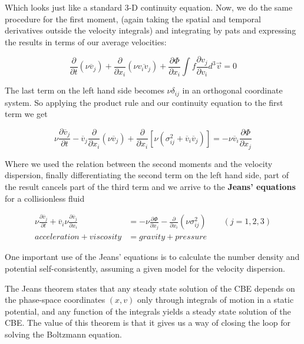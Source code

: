 Which looks just like a standard 3-D continuity equation. Now, we do the same procedure for the first moment, (again taking the spatial and temporal derivatives outside the velocity integrals) and integrating by pats and expressing the results in terms of our average velocities:

\begin{equation}
\frac{\partial}{\partial t}(\nu \overline{v}_{j})+\frac{\partial}{\partial x_{i}}(\nu \overline{v_{i}v_{j}})+\frac{\partial \Phi}{\partial x_{i}}\int f\frac{\partial v_{j}}{\partial v_{i}}d^{3}\vec{v}=0
\end{equation} 

The last term on the left hand side becomes $\nu \delta_{ij}$ in an orthogonal coordinate system. So applying the product rule and our continuity equation to the first term we get

\begin{equation}
\nu \frac{\partial \overline{v}_{j}}{\partial t}-\overline{v}_{j}\frac{\partial}{\partial x_{i}}(\nu \overline{v}_{j})+\frac{\partial}{\partial x_{i}}[\nu(\sigma_{ij}^{2}+\overline{v}_{i}\overline{v}_{j})]=-\nu \overline{v}_{i}\frac{\partial \Phi}{\partial x_{j}}
\end{equation}

Where we used the relation between the second moments and the velocity dispersion, finally differentiating the second term on the left hand side, part of the result cancels part of the third term and we arrive to the \textbf{Jeans' equations} for a collisionless fluid

\begin{equation}
\begin{aligned}	
	\nu \frac{\partial \overline{v}_j}{\partial t} + \overline{v}_i\nu \frac{\partial\overline{v}_j}{\partial x_{i}} &= -\nu \frac{\partial\Phi}{\partial x_{j}}-\frac{\partial}{\partial x_{i}}(\nu \sigma_{ij}^{2})\quad\quad (j=1,2,3) \\     acceleration + viscosity &= gravity + pressure
	\end{aligned}
\end{equation}

One important use of the Jeans' equations is to calculate the number density and potential self-consistently, assuming
a given model for the velocity dispersion.

The Jeans theorem states that any steady state solution of the CBE depends on the phase-space coordinates $(x,v)$ only through integrals of motion in a static potential, and any function of the integrals yields a steady state solution of the CBE. The value of this theorem is that it gives us a way of closing the loop for solving the Boltzmann equation. 


